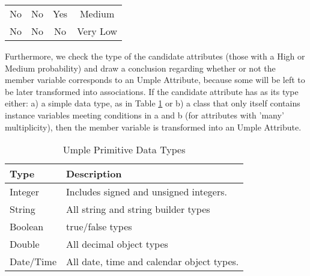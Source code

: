 \begin{table}[h]
\begin{tabular}{@{}cccc@{}}
No                                                      & No                                                 & Yes                                                & Medium                                                                                                        \\
No                                                      & No                                                 & No                                                 & Very Low                                                                                                      \\ \bottomrule
\end{tabular}
\end{table}

Furthermore, we check the type of the candidate attributes (those with a High or Medium probability) and draw a conclusion regarding whether or not the member variable corresponds to an Umple Attribute, because some will be left to be later transformed into associations. If the candidate attribute has as its type either: a) a simple data type, as in Table \ref{table:attributes2} or b) a class that only itself contains instance variables meeting conditions in a and b (for attributes with 'many' multiplicity), then the member variable is transformed into an Umple Attribute.

\begin{table}
\caption{Umple Primitive Data Types}
\label{table:attributes2}
\centering
    \begin{tabular}{ll}
		\toprule
		\rowcolor[HTML]{BBDAFF}
        \textbf{Type}      & \textbf{Description}                               \\ 
        \hline
        Integer   & Includes signed and unsigned integers.    \\ 
        String    & All string and string builder types       \\ 
        Boolean   & true/false types                          \\ 
        Double    & All decimal object types                  \\ 
        Date/Time & All date, time and calendar object types. \\
        \hline
    \end{tabular}
\end{table}


